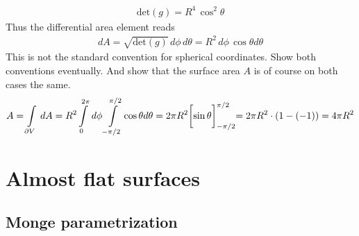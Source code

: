 \documentclass[11pt, DINA4, fleqn]{amsart}
\begin{document}
\begin{align}
\text{det}(g) = R^4\, \cos^2\theta
\end{align}
Thus the differential area element reads
\begin{align}
dA = \sqrt{\text{det}(g)} \, d\phi\, d\theta= R^2 \, d\phi \, \cos\theta d\theta
\end{align}
This is not the standard convention for spherical coordinates.
Show both conventions eventually.
And show that the surface area $A$ is of course on both cases the same.
\begin{align}
A = \int\displaylimits_{\partial V} \, dA =  R^2 \int\displaylimits_{0}^{2\pi}\, d\phi \int \displaylimits_{-\pi/2}^{\pi/2} \cos\theta d\theta
= 2\pi R^2 \biggl[\sin\theta\biggl]_{-\pi/2}^{\pi/2} = 2\pi R^2 \cdot(1-(-1)) = 4\pi R^2
\end{align}

\section{Almost flat surfaces}

\subsection{Monge parametrization}
\end{document}
